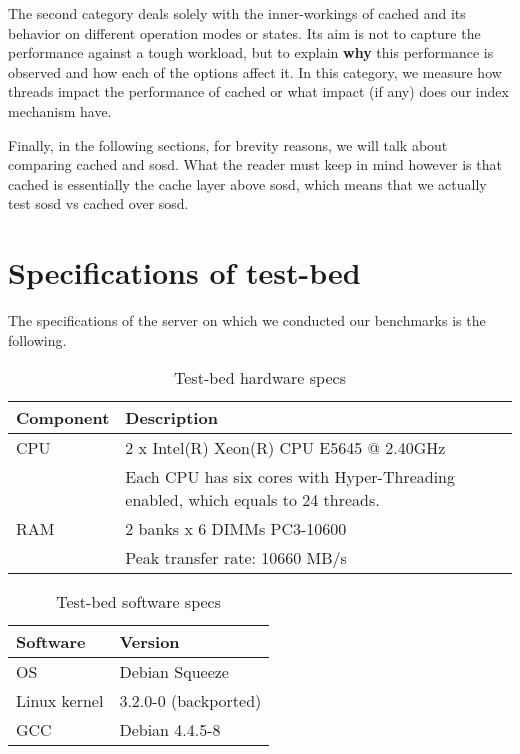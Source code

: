 The second category deals solely with the inner-workings of cached and its 
behavior on different operation modes or states. Its aim is not to capture the 
performance against a tough workload, but to explain \textbf{why} this 
performance is observed and how each of the options affect it. In this 
category, we measure how threads impact the performance of cached or what 
impact (if any) does our index mechanism have.

Finally, in the following sections, for brevity reasons, we will talk about 
comparing cached and sosd. What the reader must keep in mind however is that 
cached is essentially the cache layer above sosd, which means that we actually 
test sosd vs cached over sosd.

\section{Specifications of test-bed}\label{sec:test-bed}

The specifications of the server on which we conducted our benchmarks is the 
following.

\begin{table}[H]
	\centering
	\begin{tabular}{ | l | l | }
		\hline
		Component & Description \\ \hline \hline
		CPU &  2 x Intel(R) Xeon(R) CPU E5645 @ 2.40GHz \cite{e5645} \\
		 & Each CPU has six cores with Hyper-Threading enabled, which equals to 
		 24 threads. \\ \hline
		RAΜ & 2 banks x 6 DIMMs PC3-10600 \\
		& Peak transfer rate: 10660 MB/s \\ \hline
	\end{tabular}
	\caption{Test-bed hardware specs}
	\label{tab:hardware-specs}
\end{table}

\begin{table}[H]
	\centering
	\begin{tabular}{ | l | l | }
		\hline
		Software & Version \\ \hline \hline
		OS &  Debian Squeeze \\ \hline
		Linux kernel & 3.2.0-0 (backported) \\ \hline
		GCC & Debian 4.4.5-8 \\ \hline
	\end{tabular}
	\caption{Test-bed software specs}
	\label{tab:software-specs}
\end{table}

